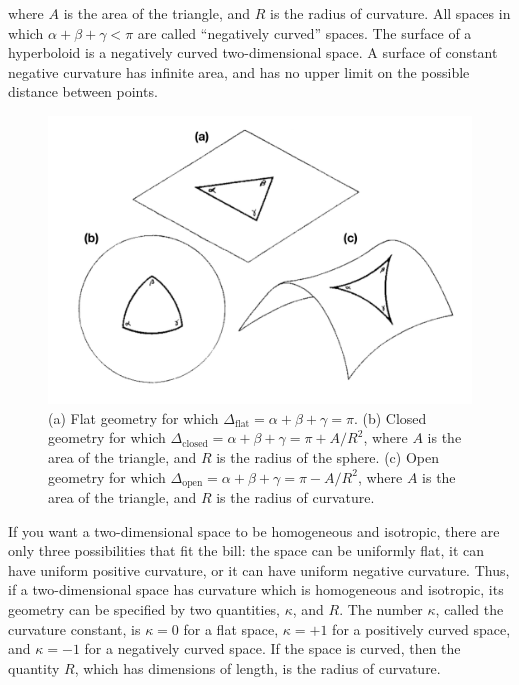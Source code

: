 \documentclass[a4paper,11pt]{article}
\begin{document}
{\noindent}where $A$ is the area of the triangle, and $R$ is the radius of curvature. All spaces in which $\alpha + \beta + \gamma < \pi$ are called ``negatively curved'' spaces. The surface of a hyperboloid is a negatively curved two-dimensional space. A surface of constant negative curvature has infinite area, and has no upper limit on the possible distance between points.

\begin{figure}[h]
    \includegraphics[width=14cm]{figures/geometries.png}
    \centering
    \caption{(a) Flat geometry for which $ \Delta_\mathrm{flat} = \alpha + \beta + \gamma = \pi$. (b) Closed geometry for which $\Delta_\mathrm{closed} = \alpha + \beta + \gamma = \pi + A/R^2$, where $A$ is the area of the triangle, and $R$ is the radius of the sphere. (c) Open geometry for which $\Delta_\mathrm{open} = \alpha + \beta + \gamma = \pi - A/R^2$, where $A$ is the area of the triangle, and $R$ is the radius of curvature.}
    \label{fig:geometries}
\end{figure}

{\noindent}If you want a two-dimensional space to be homogeneous and isotropic, there are only three possibilities that fit the bill: the space can be uniformly flat, it can have uniform positive curvature, or it can have uniform negative curvature. Thus, if a two-dimensional space has curvature which is homogeneous and isotropic, its geometry can be specified by two quantities, $\kappa$, and $R$. The number $\kappa$, called the curvature constant, is $\kappa = 0$ for a flat space, $\kappa = +1$ for a positively curved space, and $\kappa = −1$ for a negatively curved space. If the space is curved, then the quantity $R$, which has dimensions of length, is the radius of curvature.
\end{document}
